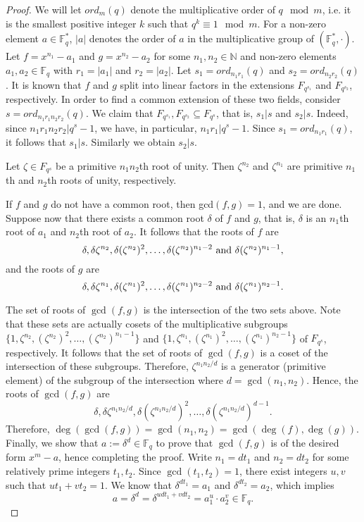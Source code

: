 \documentclass[preprint,12pt]{elsarticle}
\begin{document}
\begin{proof}
We will let  $ord_m(q)$ denote the multiplicative order of $q \mod m$, i.e. it is the smallest positive integer $k$ such that $q^k \equiv 1 \mod m$. For a non-zero element $a\in \mathbb{F}^{*}_q$, $|a|$ denotes the order of $a$ in the multiplicative group of $(\mathbb{F}^{*}_q,\cdot)$. 
Let $f=x^{n_1}-a_1$ and $g=x^{n_2}-a_2$ for some $n_1, n_2 \in \mathbb{N}$ and non-zero elements $a_1,a_2\in \mathbb{F}_q$ with $r_1=|a_1|$ and $r_2=|a_2|$. Let $s_1=ord_{n_1r_1}(q)$ and $s_2=ord_{n_2r_2}(q)$. It is known that $f$ and $g$ split into linear factors in the extensions $F_{q^{s_1}}$ and $F_{q^{s_2}}$, respectively. In order to find a common extension of these two fields, consider $s=ord_{n_1r_1n_2r_2}(q)$. We claim that $F_{q^{s_1}}, F_{q^{s_2}}\subseteq F_{q^s}$, that is, $s_1|s$ and $s_2|s$. Indeed, since $n_1r_1n_2r_2|q^s-1$, we have, in particular, $n_1r_1|q^s-1$. Since $s_1=ord_{n_1r_1}(q)$, it follows that $s_1|s$. Similarly we obtain $s_2|s$.

Let $\zeta\in F_{q^s}$ be a primitive $n_1n_2$th root of unity. Then $\zeta^{n_2}$ and $\zeta^{n_1}$ are primitive $n_1$th and $n_2$th roots of unity, respectively. 

If $f$ and $g$ do not have a common root, then gcd$(f,g)=1$, and we are done. Suppose now that there exists a common root $\delta$ of $f$ and $g$, that is,
$\delta$ is an $n_1$th root of $a_1$ and $n_2$th root of $a_2$. 
It follows that the roots of $f$ are \[\delta, \delta\zeta^{n_2}, \delta(\zeta^{n_2})^2,\dots,\delta(\zeta^{n_2})^{n_1-2} ~{\rm and}~ \delta(\zeta^{n_2})^{n_1-1},\] and the roots of $g$ are \[\delta, \delta\zeta^{n_1}, \delta(\zeta^{n_1})^2,\dots,\delta(\zeta^{n_1})^{n_2-2} ~{\rm and}~ \delta(\zeta^{n_1})^{n_2-1}.\]

The set of roots of $\gcd(f,g)$ is the intersection of the two sets above. Note that these sets are actually cosets of the multiplicative subgroups\\
 $\{1, \zeta^{n_2}, (\zeta^{n_2})^2,\dots,(\zeta^{n_2})^{n_1-1}\}$ and $\{1, \zeta^{n_1}, (\zeta^{n_1})^2,\dots,(\zeta^{n_1})^{n_2-1} \}$ of $F_{q^s}$, respectively. It follows that the set of roots of $\gcd(f,g)$ is a coset of  the intersection of these subgroups. Therefore, $\zeta^{n_1n_2/d }$ is a generator (primitive element) of the subgroup of the intersection where $d=\gcd(n_1,n_2)$. Hence, the roots of $\gcd(f,g)$ are \[\delta, \delta\zeta^{n_1n_2/d}, \delta(\zeta^{n_1n_2/d})^2,\dots,\delta(\zeta^{n_1n_2/d})^{{d-1}}.\]
Therefore, $\deg(\gcd(f,g)) = \gcd(n_1,n_2) = \gcd(\deg(f), \deg(g))$. Finally, we show that $a:=\delta^d\in \mathbb{F}_q$ to prove that $\gcd(f,g)$ is of the desired form $x^m-a$, hence completing the proof. Write $n_1=dt_1$ and $n_2=dt_2$ for some relatively prime integers $t_1,t_2$. 
Since $\gcd(t_1,t_2)=1$, there exist integers $u,v$ such that $ut_1+vt_2=1$. We know that $\delta^{dt_1}=a_1$ and $\delta^{dt_2}=a_2$, which implies
 \[ a=\delta^d=\delta^{udt_1+vdt_2}=a_1^u\cdot a_2^v \in \mathbb{F}_q. \]

\end{proof}
\end{document}

